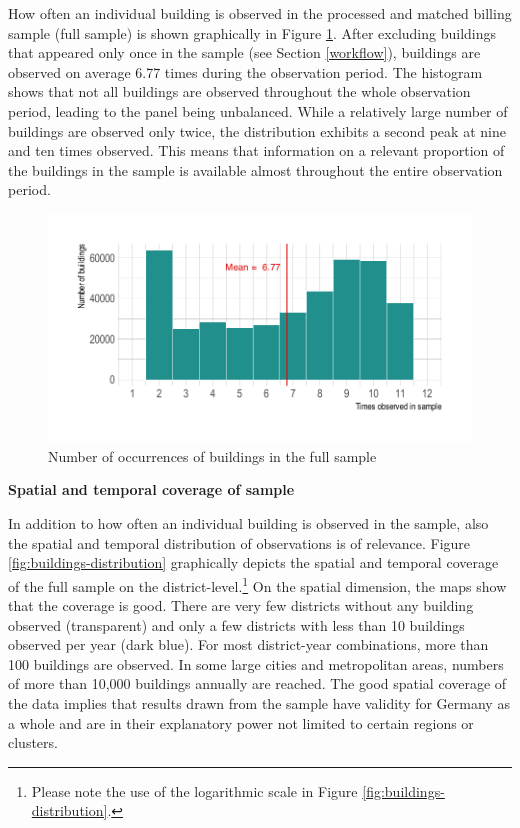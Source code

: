 \documentclass[12pt,twoside]{reedthesis}
\begin{document}
How often an individual building is observed in the processed and matched billing sample (full sample) is shown graphically in Figure \ref{fig:occurrence-buildings}. After excluding buildings that appeared only once in the sample (see Section \ref{workflow}), buildings are observed on average 6.77 times during the observation period. The histogram shows that not all buildings are observed throughout the whole observation period, leading to the panel being unbalanced. While a relatively large number of buildings are observed only twice, the distribution exhibits a second peak at nine and ten times observed. This means that information on a relevant proportion of the buildings in the sample is available almost throughout the entire observation period.
\begin{figure}

{\centering \includegraphics[width=0.75\linewidth]{figure/occurance_buildings} 

}

\caption{Number of occurrences of buildings in the full sample}\label{fig:occurrence-buildings}
\end{figure}
\textbf{Spatial and temporal coverage of sample}

In addition to how often an individual building is observed in the sample, also the spatial and temporal distribution of observations is of relevance. Figure \ref{fig:buildings-distribution} graphically depicts the spatial and temporal coverage of the full sample on the district-level.\footnote{Please note the use of the logarithmic scale in Figure \ref{fig:buildings-distribution}.} On the spatial dimension, the maps show that the coverage is good. There are very few districts without any building observed (transparent) and only a few districts with less than 10 buildings observed per year (dark blue). For most district-year combinations, more than 100 buildings are observed. In some large cities and metropolitan areas, numbers of more than 10,000 buildings annually are reached. The good spatial coverage of the data implies that results drawn from the sample have validity for Germany as a whole and are in their explanatory power not limited to certain regions or clusters.
\end{document}

